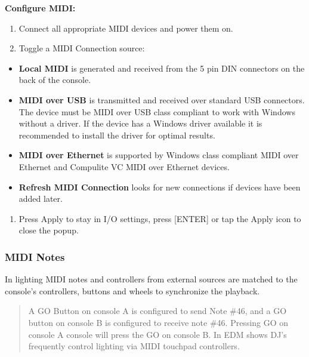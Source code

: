 \documentclass[
]{article}
\providecommand{\tightlist}{%
  \setlength{\itemsep}{0pt}\setlength{\parskip}{0pt}}
\begin{document}
\textbf{Configure MIDI:}

\begin{enumerate}
\def\labelenumi{\arabic{enumi}.}
\item
  Connect all appropriate MIDI devices and power them on.
\item
  Toggle a MIDI Connection source:
\end{enumerate}

\begin{itemize}
\item
  \textbf{Local MIDI} is generated and received from the 5 pin DIN connectors on the back of the console.
\item
  \textbf{MIDI over USB} is transmitted and received over standard USB connectors. The device must be MIDI over USB class compliant to work with Windows without a driver. If the device has a Windows driver available it is recommended to install the driver for optimal results.
\item
  \textbf{MIDI over Ethernet} is supported by Windows class compliant MIDI over Ethernet and Compulite VC MIDI over Ethernet devices.
\item
  \textbf{Refresh MIDI Connection} looks for new connections if devices have been added later.
\end{itemize}

\begin{enumerate}
\def\labelenumi{\arabic{enumi}.}
\setcounter{enumi}{2}
\tightlist
\item
  Press Apply to stay in I/O settings, press {[}ENTER{]} or tap the Apply icon to close the popup.
\end{enumerate}

\hypertarget{midi-notes}{%
\subsubsection{MIDI Notes}\label{midi-notes}}

In lighting MIDI notes and controllers from external sources are matched to the console's controllers, buttons and wheels to synchronize the playback.

\begin{quote}
A GO Button on console A is configured to send Note \#46, and a GO button on console B is configured to receive note \#46. Pressing GO on console A console will press the GO on console B. In EDM shows DJ's frequently control lighting via MIDI touchpad controllers.
\end{quote}
\end{document}

